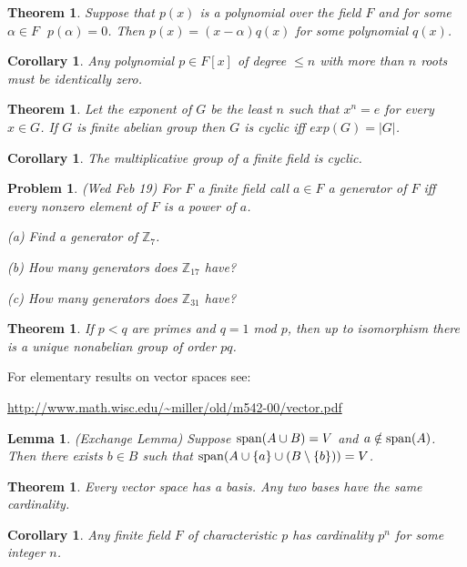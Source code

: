 \documentclass[12pt]{article}
\def\span{{\rm span}}
\def\al{\alpha}
\def\zz{{\mathbb Z}}
\def\al{\alpha}
\def\span{{ \rm span }}
\def\sm{\setminus}
\newtheorem{thm}[theorem]{Theorem}
\newtheorem{lemma}[theorem]{Lemma}
\newtheorem{cor}[theorem]{Corollary}
\newtheorem{prob}{Problem}
\begin{document}
\begin{thm}
Suppose that $p(x)$ is a polynomial over the field $F$ and for some $\al\in F$
$\;p(\al)=0$.  Then $p(x)=(x-\al)q(x)$ for
some polynomial $q(x)$.
\end{thm}

\begin{cor}
Any polynomial $p\in F[x]$ of degree $\leq n$ with more than $n$ roots
must be identically zero.
\end{cor}

\begin{thm}
Let the exponent of $G$ be the least $n$ such that
$x^n=e$ for every $x\in G$.  If $G$ is finite abelian group then 
$G$ is cyclic iff $exp(G)=|G|$.
\end{thm}

\begin{cor}
The multiplicative group of a finite field is cyclic.
\end{cor}

\begin{prob}(Wed Feb 19)
For $F$ a finite field call $a\in F$ a generator of $F$ iff
every nonzero element of $F$ is a power of $a$.
\par (a) Find a generator of $\zz_7$.
\par (b) How many generators does $\zz_{17}$ have?
\par (c) How many generators does $\zz_{31}$ have?
\end{prob}

\begin{thm}
If $p<q$ are primes and $q=1$ mod $p$, then up to isomorphism
there is a unique nonabelian group of order $pq$.
\end{thm}


For elementary results on vector spaces see:

\url{http://www.math.wisc.edu/~miller/old/m542-00/vector.pdf}



\begin{lemma}
(Exchange Lemma) Suppose $\span(A\cup B)=V$ and $a\notin \span(A)$.
Then there exists $b\in B$ such that $\span(A\cup\{a\}\cup(B\sm\{b\}))=V$.
\end{lemma}

\begin{thm}
Every vector space has a basis.  Any two bases have the
same cardinality.
\end{thm}

\begin{cor}
Any finite field $F$ of characteristic $p$ has cardinality
$p^n$ for some integer $n$.
\end{cor}
\end{document}
